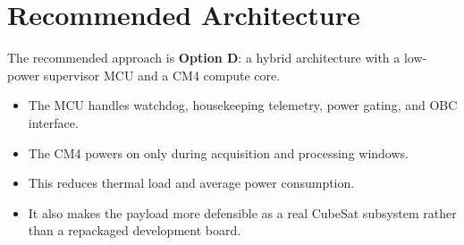 \section{Recommended Architecture}

The recommended approach is \textbf{Option D}: a hybrid architecture with a low-power supervisor MCU and a CM4 compute core.

\begin{itemize}[leftmargin=1.5em]
    \item The MCU handles watchdog, housekeeping telemetry, power gating, and OBC interface.
    \item The CM4 powers on only during acquisition and processing windows.
    \item This reduces thermal load and average power consumption.
    \item It also makes the payload more defensible as a real CubeSat subsystem rather than a repackaged development board.
\end{itemize}
